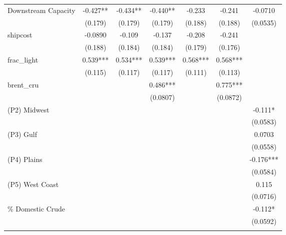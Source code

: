 {\begin{tabular}{l*{6}{c}}
\addlinespace
Downstream Capacity&   -0.427** &   -0.434** &   -0.440** &   -0.233   &   -0.241   &  -0.0710   \\
                &  (0.179)   &  (0.179)   &  (0.179)   &  (0.188)   &  (0.188)   & (0.0535)   \\
\addlinespace
shipcost        &  -0.0890   &   -0.109   &   -0.137   &   -0.208   &   -0.241   &            \\
                &  (0.188)   &  (0.184)   &  (0.184)   &  (0.179)   &  (0.176)   &            \\
\addlinespace
frac\_light      &    0.539***&    0.534***&    0.539***&    0.568***&    0.568***&            \\
                &  (0.115)   &  (0.117)   &  (0.117)   &  (0.111)   &  (0.113)   &            \\
\addlinespace
brent\_cru       &            &            &    0.486***&            &    0.775***&            \\
                &            &            & (0.0807)   &            & (0.0872)   &            \\
\addlinespace
(P2) Midwest    &            &            &            &            &            &   -0.111*  \\
                &            &            &            &            &            & (0.0583)   \\
\addlinespace
(P3) Gulf       &            &            &            &            &            &   0.0703   \\
                &            &            &            &            &            & (0.0558)   \\
\addlinespace
(P4) Plains     &            &            &            &            &            &   -0.176***\\
                &            &            &            &            &            & (0.0584)   \\
\addlinespace
(P5) West Coast &            &            &            &            &            &    0.115   \\
                &            &            &            &            &            & (0.0716)   \\
\addlinespace
\% Domestic Crude&            &            &            &            &            &   -0.112*  \\
                &            &            &            &            &            & (0.0592)   \\
\addlinespace

\end{tabular}}
